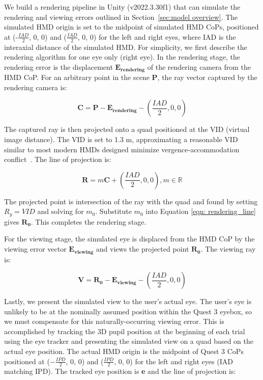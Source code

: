 We build a rendering pipeline in Unity (v2022.3.30f1) that can simulate the rendering and viewing errors outlined in Section~\ref{sec:model overview}. The simulated HMD origin is set to the midpoint of simulated HMD CoPs, positioned at (-$\frac{IAD}{2}$, 0, 0) and ($\frac{IAD}{2}$, 0, 0) for the left and right eyes, where IAD is the interaxial distance of the simulated HMD. For simplicity, we first describe the rendering algorithm for one eye only (right eye). In the rendering stage, the rendering error is the displacement $\mathbf{{E}_{rendering}}$ of the rendering camera from the HMD CoP. For an arbitrary point in the scene $\mathbf{P}$, the ray vector captured by the rendering camera is: 

\begin{equation}
	\mathbf{C} = \mathbf{P} - \mathbf{{E}_{rendering}} - (\frac{IAD}{2}, 0, 0)
\end{equation}

The captured ray is then projected onto a quad positioned at the VID (virtual image distance). The VID is set to 1.3 m, approximating a reasonable VID similar to most modern HMDs designed minimize vergence-accommodation conflict~\cite{hoffman2008vergence}. The line of projection is: 

\begin{equation}
	\label{eqn: rendering_line}
	\mathbf{R} =m \mathbf{C} + (\frac{IAD}{2}, 0, 0),  m \in \mathbb{R}
\end{equation}

The projected point is intersection of the ray with the quad and found by setting $R_{y}=VID$ and solving for $m_{0}$. Substitute $m_0$ into Equation \ref{eqn: rendering_line} gives $\mathbf{R_{0}}$. This completes the rendering stage. 

For the viewing stage, the simulated eye is displaced from the HMD CoP by the viewing error vector $\mathbf{E_{viewing}}$ and views the projected point $\mathbf{R_{0}}$. The viewing ray is: 

\begin{equation}
	\mathbf{V} = \mathbf{R_{0}} - \mathbf{E_{viewing}}- (\frac{IAD}{2}, 0, 0)
\end{equation}

Lastly, we present the simulated view to the user's actual eye. The user's eye is unlikely to be at the nominally assumed position within the Quest 3 eyebox, so we must compensate for this naturally-occurring viewing error. This is accomplished by tracking the 3D pupil position at the beginning of each trial using the eye tracker and presenting the simulated view on a quad based on the actual eye position. The actual HMD origin is the midpoint of Quest 3 CoPs positioned at ($-\frac{IPD}{2}$, 0, 0) and ($\frac{IPD}{2}$, 0, 0) for the left and right eyes (IAD matching IPD). The tracked eye position is \textbf{e} and the line of projection is: 

